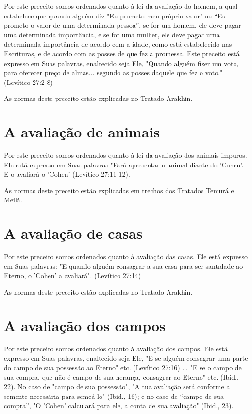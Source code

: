Por este preceito somos ordenados quanto à lei da avaliação do ho­mem, a
qual estabelece que quando alguém diz "Eu prometo meu próprio va­lor" ou
``Eu prometo o valor de uma determinada pessoa'', se for um homem, ele
deve pagar uma determinada importância, e se for uma mulher, ele deve
pagar urna determinada importância de acordo com a idade, como está
estabe­lecido nas Escrituras, e de acordo com as posses de que fez a
promessa. Este preceito está expresso em Suas palavras, enaltecido seja
Ele, "Quando alguém fizer um voto, para oferecer preço de almas...
segundo as posses daquele que fez o voto." (Levítico 27:2-8)


As normas deste preceito estão explicadas no Tratado Arakhin.


\section{A avaliação de animais}

Por este preceito somos ordenados quanto à lei da avaliação dos ani­mais
impuros. Ele está expresso em Suas palavras "Fará apresentar o animal
dian­te do 'Cohen'. E o avaliará o 'Cohen' (Levítico 27:11-12).

As normas deste preceito estão explicadas em trechos dos Tratados Temurá
e Meilá.

\section{A avaliação de casas}

Por este preceito somos ordenados quanto à avaliação das casas. Ele está
expresso em Suas palavras: "E quando alguém consagrar a sua casa para
ser santidade ao Eterno, o 'Cohen' a avaliará". (Levítico 27:14)

As normas deste preceito estão explicadas no Tratado Arakhin.

\section{A avaliação dos campos}

Por este preceito somos ordenados quanto à avaliação dos campos. Ele
está expresso em Suas palavras, enaltecido seja Ele, "E se alguém
consagrar uma parte do campo de sua possessão ao Eterno" etc. (Levítico
27:16) ... "E se o campo de sua compra, que não é campo de sua herança,
consagrar ao Eterno" etc. (Ibid., 22). No caso de "campo de sua
possessão", "A tua avaliação será con­forme a semente necessária para
semeá-lo" (Ibid., 16); e no caso de ``campo de sua compra'', "O 'Cohen'
calculará para ele, a conta de sua avaliação" (Ibid., 23).

